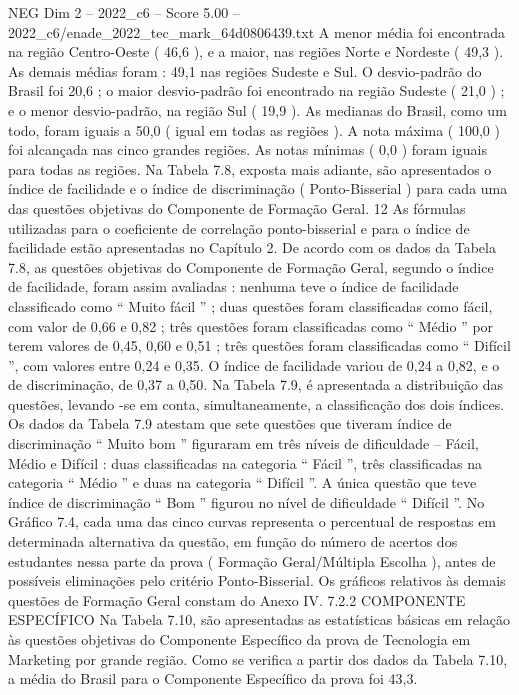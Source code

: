 \begin{textsample}{NEG Dim 2 – 2022\_c6 – Score 5.00 – 2022\_c6/enade\_2022\_tec\_mark\_64d0806439.txt}
A menor média foi encontrada na região Centro-Oeste ( 46,6 ), e a maior, nas regiões Norte e Nordeste ( 49,3 ).
As demais médias foram : 49,1 nas regiões Sudeste e Sul.
O desvio-padrão do Brasil foi 20,6 ; o maior desvio-padrão foi encontrado na região Sudeste ( 21,0 ) ; e o menor desvio-padrão, na região Sul ( 19,9 ).
As medianas do Brasil, como um todo, foram iguais a 50,0 ( igual em todas as regiões ).
A nota máxima ( 100,0 ) foi alcançada nas cinco grandes regiões.
As notas mínimas ( 0,0 ) foram iguais para todas as regiões.
Na Tabela 7.8, exposta mais adiante, são apresentados o índice de facilidade e o índice de discriminação ( Ponto-Bisserial ) para cada uma das questões objetivas do Componente de Formação Geral. 12 As fórmulas utilizadas para o coeficiente de correlação ponto-bisserial e para o índice de facilidade estão apresentadas no Capítulo 2.
De acordo com os dados da Tabela 7.8, as questões objetivas do Componente de Formação Geral, segundo o índice de facilidade, foram assim avaliadas : nenhuma teve o índice de facilidade classificado como “ Muito fácil ” ; duas questões foram classificadas como fácil, com valor de 0,66 e 0,82 ; três questões foram classificadas como “ Médio ” por terem valores de 0,45, 0,60 e 0,51 ; três questões foram classificadas como “ Difícil ”, com valores entre 0,24 e 0,35.
O índice de facilidade variou de 0,24 a 0,82, e o de discriminação, de 0,37 a 0,50.
Na Tabela 7.9, é apresentada a distribuição das questões, levando -se em conta, simultaneamente, a classificação dos dois índices.
Os dados da Tabela 7.9 atestam que sete questões que tiveram índice de discriminação “ Muito bom ” figuraram em três níveis de dificuldade – Fácil, Médio e Difícil : duas classificadas na categoria “ Fácil ”, três classificadas na categoria “ Médio ” e duas na categoria “ Difícil ”.
A única questão que teve índice de discriminação “ Bom ” figurou no nível de dificuldade “ Difícil ”.
No Gráfico 7.4, cada uma das cinco curvas representa o percentual de respostas em determinada alternativa da questão, em função do número de acertos dos estudantes nessa parte da prova ( Formação Geral/Múltipla Escolha ), antes de possíveis eliminações pelo critério Ponto-Bisserial.
Os gráficos relativos às demais questões de Formação Geral constam do Anexo IV. 7.2.2 COMPONENTE ESPECÍFICO Na Tabela 7.10, são apresentadas as estatísticas básicas em relação às questões objetivas do Componente Específico da prova de Tecnologia em Marketing por grande região.
Como se verifica a partir dos dados da Tabela 7.10, a média do Brasil para o Componente Específico da prova foi 43,3.

\end{textsample}

